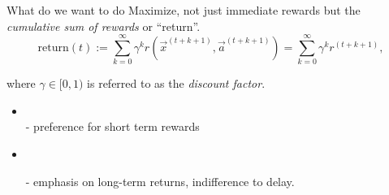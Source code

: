 \begin{frame}\frametitle{\secname}

\begin{block}{What do we want to do}
Maximize, not just immediate rewards but the \emph{cumulative sum of rewards} or ``return''.
\slidesonly{\vspace{-3mm}}
\begin{equation}
\text{return
}(t) := \sum_{k=0}^{\infty} \gamma^k r(\vec x^{(t+k+1)}, \vec a^{(t+k+1)}) = \sum_{k=0}^{\infty} \gamma^k r^{(t+k+1)},
\end{equation}

where $\gamma \in \lbrack0,1)$ is referred to as the \emph{discount factor}.
 
\end{block}


\begin{itemize}

\pause

\item {}\\

- preference for short term rewards

\pause

\item {}\\

\pause

- emphasis on long-term returns, indifference to delay.

\end{itemize}

\end{frame}

